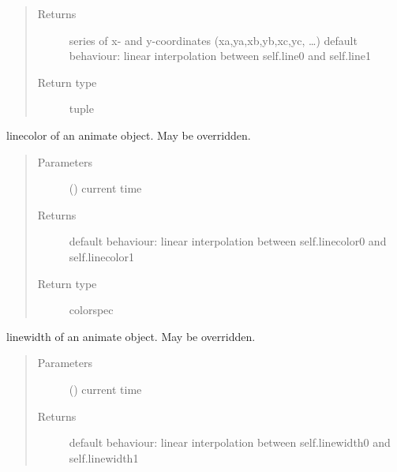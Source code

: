 \documentclass[letterpaper,10pt,english]{sphinxmanual}
\begin{document}
\begin{fulllineitems}
\begin{fulllineitems}
\begin{quote}
\begin{description}
\item[{Returns}] \leavevmode
{} \textendash{} series of x- and y-coordinates (xa,ya,xb,yb,xc,yc, …) 
default behaviour: linear interpolation between self.line0 and self.line1

\item[{Return type}] \leavevmode
tuple

\end{description}\end{quote}

\end{fulllineitems}


\begin{fulllineitems}
\label{\detokenize{Reference:salabim.Animate.linecolor}}
linecolor of an animate object. May be overridden.
\begin{quote}\begin{description}
\item[{Parameters}] \leavevmode
{} () \textendash{} current time

\item[{Returns}] \leavevmode
{} \textendash{} default behaviour: linear interpolation between self.linecolor0 and self.linecolor1

\item[{Return type}] \leavevmode
colorspec

\end{description}\end{quote}

\end{fulllineitems}


\begin{fulllineitems}
\label{\detokenize{Reference:salabim.Animate.linewidth}}
linewidth of an animate object. May be overridden.
\begin{quote}\begin{description}
\item[{Parameters}] \leavevmode
{} () \textendash{} current time

\item[{Returns}] \leavevmode
{} \textendash{} default behaviour: linear interpolation between self.linewidth0 and self.linewidth1


\end{description}
\end{quote}
\end{fulllineitems}
\end{fulllineitems}
\end{document}
